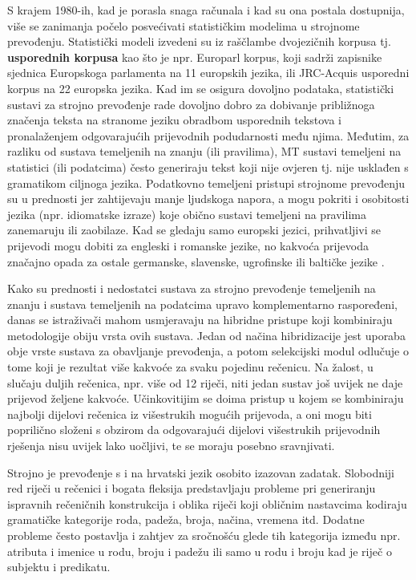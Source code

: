 \begin{multicols}{2}
S krajem 1980-ih, kad je porasla snaga računala i kad su ona postala dostupnija, više se zanimanja počelo posvećivati statističkim modelima u strojnome prevođenju. Statistički modeli izvedeni su iz raščlambe dvojezičnih korpusa tj. \textbf{usporednih korpusa} kao što je npr. Europarl korpus, koji sadrži zapisnike sjednica Europskoga parlamenta na 11 europskih jezika, ili JRC-Acquis usporedni korpus \cite{pro6} na 22 europska jezika. Kad im se osigura dovoljno podataka, statistički sustavi za strojno prevođenje rade dovoljno dobro za dobivanje približnoga značenja teksta na stranome jeziku obradbom usporednih tekstova i pronalaženjem odgovarajućih prijevodnih podudarnosti među njima. Međutim, za razliku od sustava temeljenih na znanju (ili pravilima), MT sustavi temeljeni na statistici (ili podatcima) često generiraju tekst koji nije ovjeren tj. nije usklađen s gramatikom ciljnoga jezika. Podatkovno temeljeni pristupi strojnome prevođenju su u prednosti jer zahtijevaju manje ljudskoga napora, a mogu pokriti i osobitosti jezika (npr. idiomatske izraze) koje obično sustavi temeljeni na pravilima zanemaruju ili zaobilaze. Kad se gledaju samo europski jezici, prihvatljivi se prijevodi mogu dobiti za engleski i romanske jezike, no kakvoća prijevoda značajno opada za ostale germanske, slavenske, ugrofinske ili baltičke jezike \cite{pro2}.

 
Kako su prednosti i nedostatci sustava za strojno prevođenje temeljenih na znanju i sustava temeljenih na podatcima upravo komplementarno raspoređeni, danas se istraživači mahom usmjeravaju na hibridne pristupe koji kombiniraju metodologije obiju vrsta ovih sustava. Jedan od načina hibridizacije jest uporaba obje vrste sustava za obavljanje prevođenja, a potom selekcijski modul odlučuje o tome koji je rezultat više kakvoće za svaku pojedinu rečenicu. Na žalost, u slučaju duljih rečenica, npr. više od 12 riječi, niti jedan sustav još uvijek ne daje prijevod željene kakvoće. Učinkovitijim se doima pristup u kojem se kombiniraju najbolji dijelovi rečenica iz višestrukih mogućih prijevoda, a oni mogu biti poprilično složeni s obzirom da odgovarajući dijelovi višestrukih prijevodnih rješenja nisu uvijek lako uočljivi, te se moraju posebno sravnjivati. 

Strojno je prevođenje s i na hrvatski jezik osobito izazovan zadatak. Slobodniji red riječi u rečenici i bogata fleksija predstavljaju probleme pri generiranju ispravnih rečeničnih konstrukcija i oblika riječi koji obličnim nastavcima kodiraju gramatičke kategorije roda, padeža, broja, načina, vremena itd. Dodatne probleme često postavlja i zahtjev za sročnošću glede tih kategorija između npr. atributa i imenice u rodu, broju i padežu ili samo u rodu i broju kad je riječ o subjektu i predikatu.


\end{multicols}
